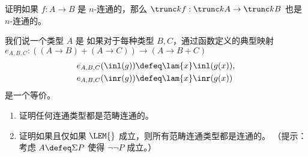 \begin{ex}\label{ex:is-conn-trunc-functor}
证明如果 $f : A \to B$ 是 $n$-连通的，那么 $\trunc kf : \trunc kA \to \trunc kB$ 也是 $n$-连通的。
\end{ex}

\begin{ex}\label{ex:categorical-connectedness}
我们说一个类型 $A$ 是  如果对于每种类型 $B, C$，通过函数定义的典型映射
$e_{A, B, C}:((A\to B) + (A\to C)) \to (A \to B + C)$
\begin{align*}
    e_{A,B,C}(\inl(g)) &\defeq \lam{x} \inl(g(x)),\\
    e_{A,B,C}(\inr(g)) &\defeq \lam{x} \inr(g(x))
\end{align*}
是一个等价。
\begin{enumerate}
    \item 证明任何连通类型都是范畴连通的。
    \item 证明如果且仅如果 $\LEM{}$ 成立，则所有范畴连通类型都是连通的。 （提示：考虑 $A \defeq \Sigma P$ 使得 $\neg \neg P$ 成立。）
\end{enumerate}
\end{ex}


